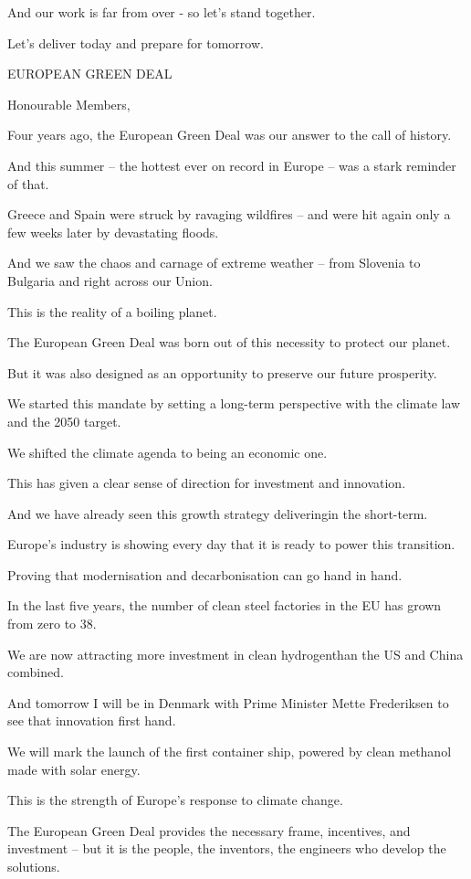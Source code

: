\documentclass[a4paper,11pt]{article}
\begin{document}
And our work is far from over - so let's stand together. 

Let's deliver today and prepare for tomorrow.

 

EUROPEAN GREEN DEAL

Honourable Members,

Four years ago, the European Green Deal was our answer to the call of history. 

And this summer – the hottest ever on record in Europe – was a stark reminder of that. 

Greece and Spain were struck by ravaging wildfires – and were hit again only a few weeks later by devastating floods.

And we saw the chaos and carnage of extreme weather – from Slovenia to Bulgaria and right across our Union.

This is the reality of a boiling planet. 

The European Green Deal was born out of this necessity to protect our planet.

But it was also designed as an opportunity to preserve our future prosperity.

We started this mandate by setting a long-term perspective with the climate law and the 2050 target.

We shifted the climate agenda to being an economic one.

This has given a clear sense of direction for investment and innovation.

And we have already seen this growth strategy deliveringin the short-term. 

Europe's industry is showing every day that it is ready to power this transition.

Proving that modernisation and decarbonisation can go hand in hand.

In the last five years, the number of clean steel factories in the EU has grown from zero to 38.

We are now attracting more investment in clean hydrogenthan the US and China combined.

And tomorrow I will be in Denmark with Prime Minister Mette Frederiksen to see that innovation first hand.

We will mark the launch of the first container ship, powered by clean methanol made with solar energy.

This is the strength of Europe's response to climate change.

The European Green Deal provides the necessary frame, incentives, and investment – but it is the people, the inventors, the engineers who develop the solutions. 
\end{document}
